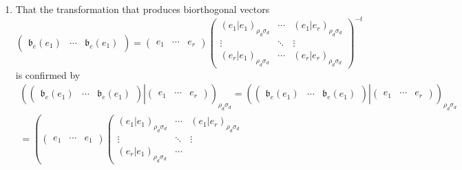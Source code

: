 \documentclass[aps,preprint]{revtex4}
\begin{document}
\begin{enumerate}
\item That the transformation that produces biorthogonal vectors 
\begin{equation}
\left( 
\begin{array}{ccc}
\mathfrak{b}_{e}\left( e_{1}\right) & \cdots & \mathfrak{b}_{e}\left(
e_{1}\right)%
\end{array}%
\right) =\left( 
\begin{array}{ccc}
e_{1} & \cdots & e_{r}%
\end{array}%
\right) \left( 
\begin{array}{ccc}
\left( \left. e_{1}\right\vert e_{1}\right) _{\rho _{d}\sigma _{d}} & \cdots
& \left( \left. e_{1}\right\vert e_{r}\right) _{\rho _{d}\sigma _{d}} \\ 
\vdots & \ddots & \vdots \\ 
\left( \left. e_{r}\right\vert e_{1}\right) _{\rho _{d}\sigma _{d}} & \cdots
& \left( \left. e_{r}\right\vert e_{r}\right) _{\rho _{d}\sigma _{d}}%
\end{array}%
\right) ^{\boldsymbol{-}t}
\end{equation}%
is confirmed by 
\begin{gather}
\left( \left. \left( 
\begin{array}{ccc}
\mathfrak{b}_{e}\left( e_{1}\right) & \cdots & \mathfrak{b}_{e}\left(
e_{1}\right)%
\end{array}%
\right) \right\vert \left( 
\begin{array}{ccc}
e_{1} & \cdots & e_{r}%
\end{array}%
\right) \right) _{\rho _{d}\sigma _{d}}=\left( \left. \left( 
\begin{array}{ccc}
\mathfrak{b}_{e}\left( e_{1}\right) & \cdots & \mathfrak{b}_{e}\left(
e_{1}\right)%
\end{array}%
\right) \right\vert \left( 
\begin{array}{ccc}
e_{1} & \cdots & e_{r}%
\end{array}%
\right) \right) _{\rho _{d}\sigma _{d}} \\
=\left( \left. \left( 
\begin{array}{ccc}
e_{1} & \cdots & e_{1}%
\end{array}%
\right) \left( 
\begin{array}{ccc}
\left( \left. e_{1}\right\vert e_{1}\right) _{\rho _{d}\sigma _{d}} & \cdots
& \left( \left. e_{1}\right\vert e_{r}\right) _{\rho _{d}\sigma _{d}} \\ 
\vdots & \ddots & \vdots \\ 
\left( \left. e_{r}\right\vert e_{1}\right) _{\rho _{d}\sigma _{d}} & \cdots

\end{array}
\end{gather}
\end{enumerate}
\end{document}
